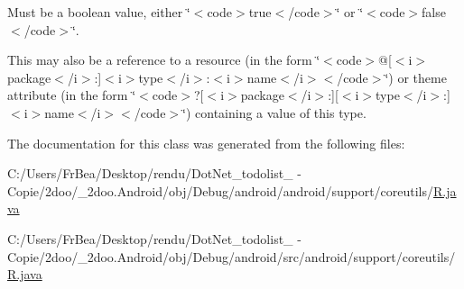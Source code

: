 Must be a boolean value, either \char`\"{}$<$code$>$true$<$/code$>$\char`\"{} or \char`\"{}$<$code$>$false$<$/code$>$\char`\"{}. 

This may also be a reference to a resource (in the form \char`\"{}$<$code$>$@\mbox{[}$<$i$>$package$<$/i$>$:\mbox{]}$<$i$>$type$<$/i$>$:$<$i$>$name$<$/i$>$$<$/code$>$\char`\"{}) or theme attribute (in the form \char`\"{}$<$code$>$?\mbox{[}$<$i$>$package$<$/i$>$:\mbox{]}\mbox{[}$<$i$>$type$<$/i$>$:\mbox{]}$<$i$>$name$<$/i$>$$<$/code$>$\char`\"{}) containing a value of this type. 

The documentation for this class was generated from the following files:\begin{CompactItemize}
\item 
C:/Users/FrBea/Desktop/rendu/DotNet\_\-todolist\_ - Copie/2doo/\_\-2doo.Android/obj/Debug/android/android/support/coreutils/\hyperlink{android_2support_2coreutils_2_r_8java}{R.java}\item 
C:/Users/FrBea/Desktop/rendu/DotNet\_\-todolist\_ - Copie/2doo/\_\-2doo.Android/obj/Debug/android/src/android/support/coreutils/\hyperlink{src_2android_2support_2coreutils_2_r_8java}{R.java}\end{CompactItemize}
